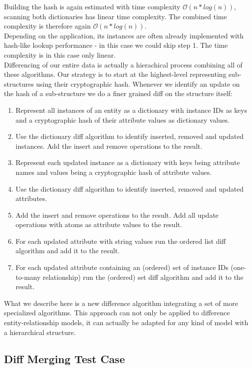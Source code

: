 Building the hash is again estimated with time complexity $ \mathcal O(n * log(n)) $, scanning both dictionaries has linear time complexity. The combined time complexity is therefore again $ \mathcal O(n * log(n)) $.\\
Depending on the application, its instances are often already implemented with hash-like lookup performance - in this case we could skip step 1.
The time complexity is in this case only linear.\\

Differencing of our entire data is actually a hierachical process combining all of these algorithms.
Our strategy is to start at the highest-level representing sub-structures using their cryptographic hash.
Whenever we identify an update on the hash of a sub-structure we do a finer grained diff on the structure itself:

\begin{enumerate}
\item Represent all instances of an entity as a dictionary with instance IDs as keys and a cryptographic hash of their attribute values as dictionary values.
\item Use the dictionary diff algorithm to identify inserted, removed and updated instances. Add the insert and remove operations to the result.
\item Represent each updated instance as a dictionary with keys being attribute names and values being a cryptographic hash of attribute values.
\item Use the dictionary diff algorithm to identify inserted, removed and updated attributes.
\item Add the insert and remove operations to the result. Add all update operations with atoms as attribute values to the result.
\item For each updated attribute with string values run the ordered list diff algorithm and add it to the result.
\item For each updated attribute containing an (ordered) set of instance IDs (one-to-many relationship) run the (ordered) set diff algorithm and add it to the result.
\end{enumerate}

What we describe here is a new difference algorithm integrating a set of more specialized algorithms.
This approach can not only be applied to difference entity-relationship models, it can actually be adapted for any kind of model with a hierarchical structure. 

\subsection{Diff Merging Test Case}

